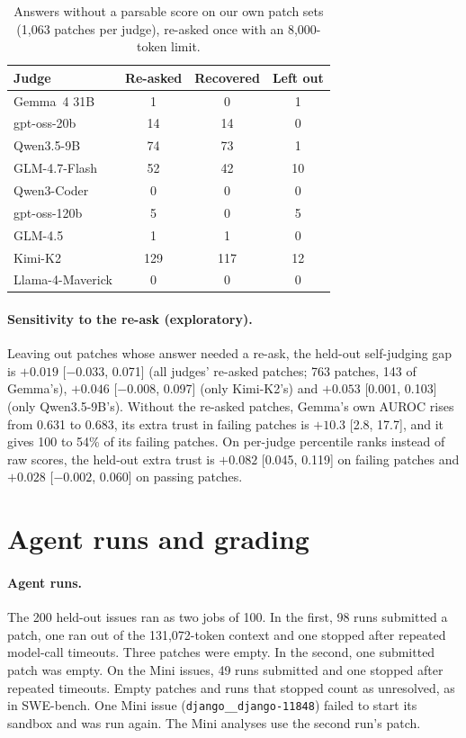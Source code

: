 \documentclass[10pt,letterpaper]{article}
\begin{document}
\begin{table}[H]
\centering
\small
\caption{Answers without a parsable score on our own patch sets (1,063 patches per judge), re-asked once with an
8,000-token limit.}
\label{tab:reask}
\begin{tabular}{@{}lccc@{}}
\toprule
Judge & Re-asked & Recovered & Left out \\
\midrule
Gemma~4 31B & 1 & 0 & 1 \\
gpt-oss-20b & 14 & 14 & 0 \\
Qwen3.5-9B & 74 & 73 & 1 \\
GLM-4.7-Flash & 52 & 42 & 10 \\
Qwen3-Coder & 0 & 0 & 0 \\
gpt-oss-120b & 5 & 0 & 5 \\
GLM-4.5 & 1 & 1 & 0 \\
Kimi-K2 & 129 & 117 & 12 \\
Llama-4-Maverick & 0 & 0 & 0 \\
\bottomrule
\end{tabular}
\end{table}

\paragraph{Sensitivity to the re-ask (exploratory).} Leaving out patches whose answer needed a re-ask, the held-out
self-judging gap is $+0.019$ [$-0.033$, 0.071] (all judges' re-asked patches; 763 patches, 143 of Gemma's), $+0.046$
[$-0.008$, 0.097] (only Kimi-K2's) and $+0.053$ [0.001, 0.103] (only Qwen3.5-9B's). Without the re-asked patches,
Gemma's own AUROC rises from 0.631 to 0.683, its extra trust in failing patches is $+10.3$ [2.8, 17.7], and it
gives 100 to 54\% of its failing patches. On per-judge percentile ranks instead of raw scores, the held-out extra trust is $+0.082$
[0.045, 0.119] on failing patches and $+0.028$ [$-0.002$, 0.060] on passing patches.

\section{Agent runs and grading}
\label{app:grading}

\paragraph{Agent runs.} The 200 held-out issues ran as two jobs of 100. In the first, 98 runs submitted a patch, one
ran out of the 131,072-token context and one stopped after repeated model-call timeouts. Three patches were empty. In the second, one submitted patch was empty. On the Mini issues, 49 runs
submitted and one stopped after repeated timeouts. Empty patches and runs that stopped count as unresolved, as in
SWE-bench. One Mini issue (\texttt{django\_\_django-11848}) failed to start its sandbox and was run again. The Mini
analyses use the second run's patch.
\end{document}
